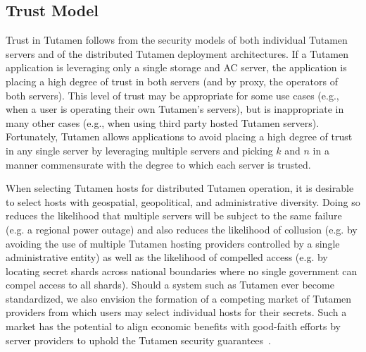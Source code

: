 \subsection{Trust Model}

Trust in Tutamen follows from the security models of both individual
Tutamen servers and of the distributed Tutamen deployment
architectures. If a Tutamen application is leveraging only a single
storage and AC server, the application is placing a high degree of
trust in both servers (and by proxy, the operators of both
servers). This level of trust may be appropriate for some use cases
(e.g., when a user is operating their own Tutamen's servers), but is
inappropriate in many other cases (e.g., when using third party hosted
Tutamen servers). Fortunately, Tutamen allows applications to avoid
placing a high degree of trust in any single server by leveraging
multiple servers and picking $k$ and $n$ in a manner commensurate with
the degree to which each server is trusted.

When selecting Tutamen hosts for distributed Tutamen operation, it is
desirable to select hosts with geospatial, geopolitical, and
administrative diversity. Doing so reduces the likelihood that
multiple servers will be subject to the same failure (e.g. a regional
power outage) and also reduces the likelihood of collusion (e.g. by
avoiding the use of multiple Tutamen hosting providers controlled by a
single administrative entity) as well as the likelihood of compelled
access (e.g. by locating secret shards across national boundaries
where no single government can compel access to all shards). Should a
system such as Tutamen ever become standardized, we also envision the
formation of a competing market of Tutamen providers from which users
may select individual hosts for their secrets. Such a market has the
potential to align economic benefits with good-faith efforts by server
providers to uphold the Tutamen security guarantees~\cite{sayler-phd}.

